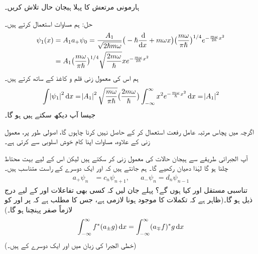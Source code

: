 ہارمونی مرتعش کا پہلا ہیجان حال تلاش کریں۔ 

حل:\quad
 ہم مساوات  استعمال کرتے ہیں۔ 
\begin{gather}
\begin{aligned}\label{مساوات_شروڈنگر_ہارمونی_ہیجان_حالات}
\psi_1 (x) &= A_1 a_+ \psi_0 = \frac{ A_1 }{ \sqrt{ 2 \hslash m \omega } } \big( -\hslash \frac{\dif}{\dif x} + m \omega x\big) \big( \frac{ m \omega}{ \pi \hslash} \big)^{1/4} e^{-\frac{ m \omega }{ 2 \hslash } x^2}\\
 &= A_1 \big( \frac{ m \omega }{ \pi \hslash}\big)^{1/4} \sqrt{ \frac{ 2 m \omega }{ \hslash} } x e^{-\frac{ m \omega }{ 2 \hslash } x^2}
\end{aligned}
\end{gather}
ہم اس کی معمول زنی  قلم و کاغذ کے ساتھ  کرتے  ہیں۔ 
\begin{align*}
\int \abs{\psi_1}^2 \dif x = \abs{A_1 }^2 \sqrt{ \frac{ m \omega}{ \pi \hslash } } \big( \frac{ 2 m \omega }{ \hslash} \big ) \int_{ - \infty }^{ \infty } x^2 e^{-\frac{ m \omega }{ \hslash } x^2} \dif x = \abs{A_1}^2
\end{align*} 
جیسا آپ دیکھ سکتے ہیں  ہو گا۔
 
اگرچہ میں پچاس مرتبہ عامل رفعت استعمال کر کے  حاصل نہیں کرنا چاہوں گا، اصولی طور پر، معمول زنی کے علاوہ، مساوات  اپنا کام خوش اسلوبی سے کرتی ہے۔

 آپ الجبرائی طریقے سے ہیجان حالات کی معمول زنی کر  سکتے ہیں لیکن اس کے لیے بہت محتاط چلنا ہو گا لہٰذا دھیان رکھیے گا۔ ہم جانتے ہیں کہ 
 اور  ایک دوسرے کے راست متناسب ہیں۔ 
\begin{align} 
a_+ \psi_n&= c_n \psi_{n+1} , && a_- \psi_n = d_n \psi_{n-1}
\end{align} 
 تناسبی مستقل  اور  کیا ہوں گے؟ پہلے جان لیں کہ کسی بھی تفاعلات  اور  کے لیے درج ذیل ہو گا۔(ظاہر ہے کہ تکملات کا موجود ہونا لازمی ہے، جس کا مطلب ہے کہ  پر  اور  کو لازماً صفر پہنچنا ہو گا۔)
\begin{align}\label{مساوات_شروڈنگر_سیڑھی_متبادل}
\int_{ - \infty }^{ \infty } f^*( a_{\pm} g ) \dif x = \int_{ - \infty }^{ \infty } ( a_{\mp} f)^* g \dif x
\end{align}
(خطی الجبرا کی زبان میں  اور  ایک دوسرے کے  ہیں۔)

